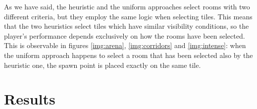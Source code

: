 As we have said, the heuristic and the uniform approaches select rooms with two different criteria, but they employ the same logic when selecting tiles. This means that the two heuristics select tiles which have similar visibility conditions, so the player's performance depends exclusively on how the rooms have been selected. This is observable in figures \ref{img:arena}, \ref{img:corridors} and \ref{img:intense}: when the uniform approach happens to select a room that has been selected also by the heuristic one, the spawn point is placed exactly on the same tile.


\section{Results}

